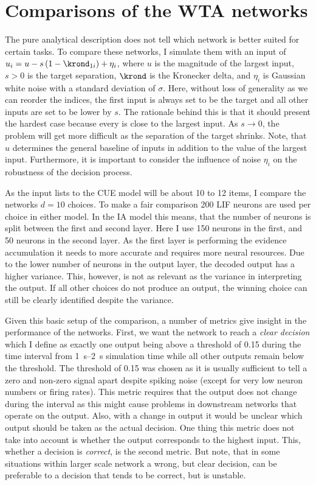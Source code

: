 \section{Comparisons of the WTA networks}
The pure analytical description does not tell which network is better suited for certain tasks.
To compare these networks, I simulate them with an input of $u_i = u - s\del{1 - \krond_{1i}} + \eta_i$, where $u$ is the magnitude of the largest input, $s > 0$ is the target separation, $\krond$ is the Kronecker delta, and $\eta_i$ is Gaussian white noise with a standard deviation of $\sigma$.
Here, without loss of generality as we can reorder the indices, the first input is always set to be the target and all other inputs are set to be lower by $s$.
The rationale behind this is that it should present the hardest case because every is close to the largest input.
As $s \rightarrow 0$, the problem will get more difficult as the separation of the target shrinks.
Note, that $u$ determines the general baseline of inputs in addition to the value of the largest input.
Furthermore, it is important to consider the influence of noise $\eta_i$ on the robustness of the decision process.

As the input lists to the CUE model will be about 10 to 12 items, I compare the networks $d=10$ choices.
To make a fair comparison 200 LIF neurons are used per choice in either model.
In the IA model this means, that the number of neurons is split between the first and second layer.
Here I use 150 neurons in the first, and 50 neurons in the second layer.
As the first layer is performing the evidence accumulation it needs to more accurate and requires more neural resources.
Due to the lower number of neurons in the output layer, the decoded output has a higher variance.
This, however, is not as relevant as the variance in interpreting the output.
If all other choices do not produce an output, the winning choice can still be clearly identified despite the variance.

Given this basic setup of the comparison, a number of metrics give insight in the performance of the networks.
First, we want the network to reach a \emph{clear decision} which I define as exactly one output being above a threshold of \num{0.15} during the time interval from \SIrange{1}{2}{\second} simulation time while all other outputs remain below the threshold.
The threshold of \num{0.15} was chosen as it is usually sufficient to tell a zero and non-zero signal apart despite spiking noise (except for very low neuron numbers or firing rates).
This metric requires that the output does not change during the interval as this might cause problems in downstream networks that operate on the output.
Also, with a change in output it would be unclear which output should be taken as the actual decision.
One thing this metric does not take into account is whether the output corresponds to the highest input.
This, whether a decision is \emph{correct}, is the second metric.
But note, that in some situations within larger scale network a wrong, but clear decision, can be preferable to a decision that tends to be correct, but is unstable.

